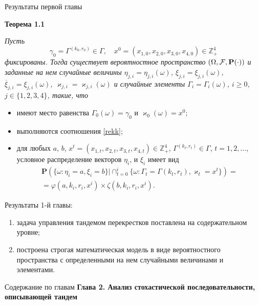 \documentclass[10pt]{beamer}
\begin{document}
\begin{frame}[allowframebreaks]{Результаты первой главы}

    {\bf Теорема 1.1} {\it 
    Пусть 
    $$\gamma_0=\Gamma^{(k_0,r_0)} \in \Gamma, \quad x^0=(x_{1,0},x_{2,0}, x_{3,0},x_{4,0})\in \mathbb{Z}_+^4$$ фиксированы. Тогда существует вероятностное пространство $(\Omega, {\cal F}, {\mathbf P}(\cdot))$ и заданные на нем случайные величины $\eta_{j,i}=\eta_{j,i}(\omega)$, $\xi_{j,i}=\xi_{j,i}(\omega)$, $\overline{\xi}_{j,i}=\xi_{j,i}(\omega)$, $\varkappa_{j,i}=\varkappa_{j,i}(\omega)$ и случайные элементы $\Gamma_i=\Gamma_i(\omega)$, $i\geqslant 0$, $j\in \{1, 2, 3, 4\}$, такие, что 
    \begin{itemize}
    \item имеют место равенства $\Gamma_0(\omega) = \gamma_0$ и $\varkappa_0(\omega)=x^0$;
    \item выполняются соотношения \eqref{rekk};
    \item для любых  $a$, $b$, $x^t=(x_{1,t},x_{2,t},x_{3,t},x_{4,t}) \in \mathbb{Z}_+^4$, $\Gamma^{(k_t,r_t)} \in \Gamma$, $t = 1, 2, \ldots$, условное распределение векторов $\eta_i$, и $\xi_i$ имеет вид 
\begin{multline*}
    {\mathbf P}(\{ \omega \colon \eta_i = a, \xi_i=b\} |\cap_{t=0}^{i}\{\omega\colon \Gamma_t=\Gamma{(k_t,r_t)}, \varkappa_t=x^t\})=\\
=\varphi(a,k_i,r_i,x^i)\times \zeta(b,k_i,r_i,x^i).
\end{multline*}
    \end{itemize}
}

\framebreak

Результаты 1-й главы:
\begin{enumerate}
    \item задача управления тандемом перекрестков поставлена на содержательном уровне;
    \item построена строгая математическая модель в виде вероятностного пространства с определенными на нем случайными величинами и элементами.

\end{enumerate}


\end{frame}



  \begin{frame}{Содержание по главам}
  \Large{\textbf{Глава 2. Анализ стохастической последовательности, описывающей тандем}}\par


      \end{frame}
\end{document}
